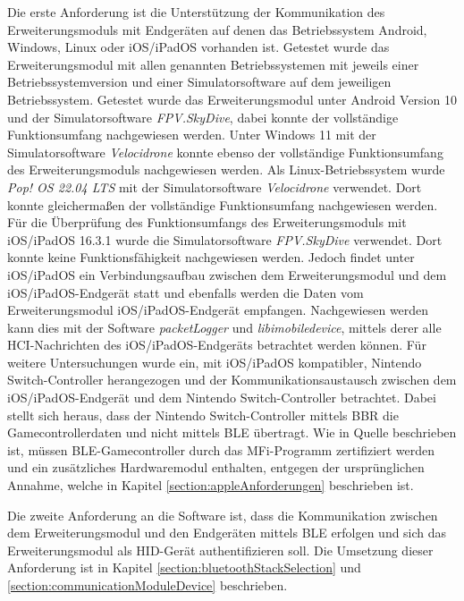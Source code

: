 Die erste Anforderung ist die Unterstützung der Kommunikation des Erweiterungsmoduls mit Endgeräten auf denen das Betriebssystem Android, Windows, Linux oder iOS/iPadOS vorhanden ist. Getestet wurde das Erweiterungsmodul mit allen genannten Betriebssystemen mit jeweils einer Betriebssystemversion und einer Simulatorsoftware auf dem jeweiligen Betriebssystem. Getestet wurde das Erweiterungsmodul unter Android Version 10 und der Simulatorsoftware \textit{FPV.SkyDive}, dabei konnte der vollständige Funktionsumfang nachgewiesen werden. Unter Windows 11 mit der Simulatorsoftware \textit{Velocidrone} konnte ebenso der vollständige Funktionsumfang des Erweiterungsmoduls nachgewiesen werden. Als Linux-Betriebssystem wurde \textit{Pop! OS 22.04 LTS} mit der Simulatorsoftware \textit{Velocidrone} verwendet. Dort konnte gleichermaßen der vollständige Funktionsumfang nachgewiesen werden. Für die Überprüfung des Funktionsumfangs des Erweiterungsmoduls mit iOS/iPadOS 16.3.1 wurde die Simulatorsoftware \textit{FPV.SkyDive} verwendet. Dort konnte keine Funktionsfähigkeit nachgewiesen werden. Jedoch findet unter iOS/iPadOS ein Verbindungsaufbau zwischen dem Erweiterungsmodul und dem iOS/iPadOS-Endgerät statt und ebenfalls werden die Daten vom Erweiterungsmodul iOS/iPadOS-Endgerät empfangen. Nachgewiesen werden kann dies mit der Software \textit{packetLogger} und \textit{libimobiledevice}, mittels derer alle \ac{HCI}-Nachrichten des iOS/iPadOS-Endgeräts betrachtet werden können. Für weitere Untersuchungen wurde ein, mit iOS/iPadOS kompatibler, Nintendo Switch-Controller herangezogen und der Kommunikationsaustausch zwischen dem iOS/iPadOS-Endgerät und dem Nintendo Switch-Controller betrachtet. Dabei stellt sich heraus, dass der Nintendo Switch-Controller mittels \ac{BBR} die Gamecontrollerdaten und nicht mittels \ac{BLE} übertragt. Wie in Quelle \cite{lemmingDevESP32Comment} beschrieben ist, müssen \ac{BLE}-Gamecontroller durch das \ac{MFi}-Programm zertifiziert werden und ein zusätzliches Hardwaremodul enthalten, entgegen der ursprünglichen Annahme, welche in Kapitel \ref{section:appleAnforderungen} beschrieben ist.

Die zweite Anforderung an die Software ist, dass die Kommunikation zwischen dem Erweiterungsmodul und den Endgeräten mittels \ac{BLE} erfolgen und sich das Erweiterungsmodul als \ac{HID}-Gerät authentifizieren soll. Die Umsetzung dieser Anforderung ist in Kapitel \ref{section:bluetoothStackSelection} und \ref{section:communicationModuleDevice} beschrieben.

